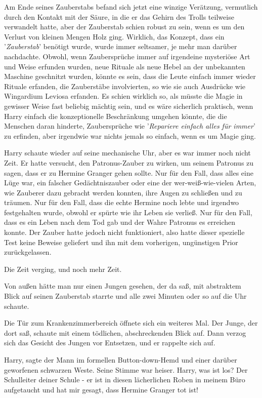 Am Ende seines Zauberstabs befand sich jetzt eine winzige Verätzung, vermutlich
durch den Kontakt mit der Säure, in die er das Gehirn des Trolls teilweise
verwandelt hatte, aber der Zauberstab schien robust zu sein, wenn es um den
Verlust von kleinen Mengen Holz ging. Wirklich, das Konzept, dass ein
'\emph{Zauberstab}' benötigt wurde, wurde immer seltsamer, je mehr man darüber
nachdachte. Obwohl, wenn Zaubersprüche immer auf irgendeine mysteriöse Art und
Weise erfunden wurden, neue Rituale als neue Hebel an der unbekannten Maschine
geschnitzt wurden, könnte es sein, dass die Leute einfach immer wieder Rituale
erfanden, die Zauberstäbe involvierten, so wie sie auch Ausdrücke wie \glqq{}
Wingardium Leviosa\grqq{} erfanden. Es schien wirklich so, als müsste die Magie
in gewisser Weise fast beliebig mächtig sein, und es wäre sicherlich praktisch,
wenn Harry einfach die konzeptionelle Beschränkung umgehen könnte, die die
Menschen daran hinderte, Zaubersprüche wie '\emph{Repariere einfach alles für
immer}' zu erfinden, aber irgendwie war nichts jemals so einfach, wenn es um
Magie ging.

Harry schaute wieder auf seine mechanische Uhr, aber es war immer noch nicht
Zeit. Er hatte versucht, den Patronus-Zauber zu wirken, um seinem Patronus zu
sagen, dass er zu Hermine Granger gehen sollte. Nur für den Fall, dass alles
eine Lüge war, ein falscher Gedächtniszauber oder eine der wer-weiß-wie-vielen
Arten, wie Zauberer dazu gebracht werden konnten, ihre Augen zu schließen und zu
träumen. Nur für den Fall, dass die echte Hermine noch lebte und irgendwo
festgehalten wurde, obwohl er spürte wie ihr Leben sie verließ. Nur für den
Fall, dass es ein Leben nach dem Tod gab und der Wahre Patronus es erreichen
konnte. Der Zauber hatte jedoch nicht funktioniert, also hatte dieser spezielle
Test keine Beweise geliefert und ihn mit dem vorherigen, ungünstigen Prior
zurückgelassen.

Die Zeit verging, und noch mehr Zeit.

Von außen hätte man nur einen Jungen gesehen, der da saß, mit abstraktem Blick
auf seinen Zauberstab starrte und alle zwei Minuten oder so auf die Uhr schaute.

Die Tür zum Krankenzimmerbereich öffnete sich ein weiteres Mal. Der Junge, der
dort saß, schaute mit einem tödlichen, abschreckenden Blick auf. Dann verzog
sich das Gesicht des Jungen vor Entsetzen, und er rappelte sich auf.

\glqq{}Harry\grqq{}, sagte der Mann im formellen Button-down-Hemd und einer
darüber geworfenen schwarzen Weste. Seine Stimme war heiser. \glqq{}Harry, was
ist los? Der Schulleiter deiner Schule - er ist in diesen lächerlichen Roben in
meinem Büro aufgetaucht und hat mir gesagt, dass Hermine Granger tot ist!\grqq{}

